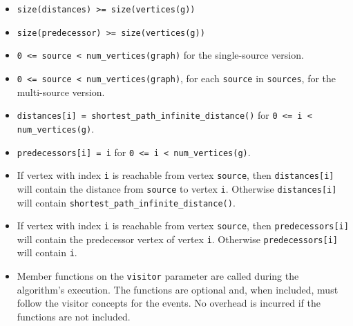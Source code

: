 \begin{itemdescr}
      \pnum\hardprecond
            \begin{itemize}
                  \item \lstinline{size(distances) >= size(vertices(g))}
                  \item \lstinline{size(predecessor) >= size(vertices(g))}
                  \item
                        \lstinline{0 <= source < num_vertices(graph)} for the single-source version. 
                  \item
                        \lstinline{0 <= source < num_vertices(graph)}, for each \lstinline{source} in \lstinline{sources}, 
                                   for the multi-source version.
            \end{itemize}
      \pnum\preconditions
            \begin{itemize}
                  \item
                        \lstinline{distances[i] = shortest_path_infinite_distance()} for \lstinline{0 <= i < num_vertices(g)}.
                  \item
                        \lstinline{predecessors[i] = i} for \lstinline{0 <= i < num_vertices(g)}.
            \end{itemize}
      \pnum\effects
            \begin{itemize}
                  \item
                        If vertex with index \lstinline{i} is reachable from vertex \lstinline{source}, then
                        \lstinline{distances[i]} will contain the distance from \lstinline{source} to vertex
                        \lstinline{i}.  Otherwise \lstinline{distances[i]} will contain
                        \lstinline{shortest_path_infinite_distance()}.
                  \item
                        If vertex with index \lstinline{i} is reachable
                        from vertex \lstinline{source}, then \lstinline{predecessors[i]} will contain the
                        predecessor vertex of vertex \lstinline{i}. Otherwise \lstinline{predecessors[i]} will contain
                        \lstinline{i}.
                  \item Member functions on the \lstinline{visitor} parameter are called during the algorithm's execution.
                        The functions are optional and, when included, must follow the visitor concepts for the events.
                        No overhead is incurred if the functions are not included.

\end{itemize}
\end{itemdescr}
